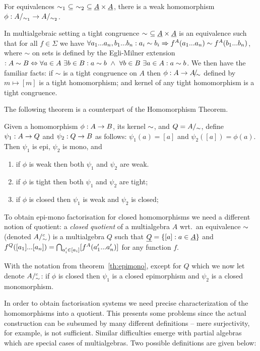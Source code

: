 \documentclass[10pt]{article}
\begin{document}
\begin{Fact}
\label{fa:subeq}
For equivalences %
$\sim_1\
\subseteq\ \sim_2\ \subseteq \underline {A}\times\underline {A}$, there is a weak homomorphism
$\phi:A/_{\sim_{1}}\rightarrow A/_{\sim_{2}}$.
\end{Fact}

\noindent
In multialgebraic setting  a tight congruence $\sim\ \subseteq
\underline {A}\times\underline {A}$  is an equivalence such that for all
$f\in\Sigma$ we have $\forall a_{1}...a_{n},b_{1}...b_{n}:a_i\sim b_i \Rightarrow f^A(a_{1}...a_{n})\sim f^A(b_{1}...b_{n})$, where $\sim$ on sets is defined by the
Egli-Milner extension $:A\sim B\Leftrightarrow \forall a\in A\ \exists b\in
B:a\sim b\ \land\ \forall b\in B\ \exists a\in A:a\sim b$.  We then
have the familiar facts: if $\sim$ is a tight congruence on $A$ then
$\phi:A\rightarrow A\!{\textstyle /}\!_{\sim}$ defined by $m\mapsto [m]$ is a tight
homomorphism; and kernel of any tight homomorphism is a tight
congruence.

The following theorem is a counterpart of the  Homomorphism
Theorem.

\begin{Theorem}
\label{th:epimono}
Given  a homomorphism $\phi: A \rightarrow B$, its kernel
$\sim$, and $Q = A/_\sim$, define
$\psi_1: A \rightarrow Q$ and $\psi_2: Q \rightarrow B$ as follows: $\psi_1(a) =
[a]$ and $\psi_2([a]) = \phi(a)$. Then $\psi_1$ is epi, $\psi_2$ is
mono, and
\begin{enumerate}\MyLPar
\item{if $\phi$ is weak then both $\psi_1$ and $\psi_2$ are weak.}
\item{if $\phi$ is tight then both $\psi_1$ and $\psi_2$ are tight;}
\item{if $\phi$ is closed then $\psi_1$ is weak and $\psi_2$ is closed;}
\end{enumerate}
\end{Theorem}
%
To obtain epi-mono factorisation for closed
homomorphisms we need a different notion of quotient: a {\em closed
quotient\/} of a multialgebra $A$ wrt.\ an equivalence $\sim$
(denoted $A/^c_\sim$) is a multialgebra $Q$ such that $\underline {Q} = \{
[a] : a \in \underline {A} \}$ and $f^Q([a_{1}]...[a_{n}]) = \bigcap_{a'_i
\in [a_i]} [f^A(a'_{1}...a'_{n})]$ for any function $f$.

\begin{Theorem}
With the notation from theorem~\ref{th:epimono}, except for $Q$ which
we now let denote $A/^c_\sim$: if $\phi$ is closed then
$\psi_1$ is a closed epimorphism and $\psi_2$ is a closed monomorphism.
\end{Theorem}
%
In order to obtain factorisation systems we need precise
characterization of the homomorphisms into a quotient. This presents
some problems since the actual construction can be subsumed by many
different definitions --  mere surjectivity, for example, is not
sufficient. Similar difficulties emerge with partial algebras
which are special cases of multialgebras. Two possible definitions are
given below:
\end{document}
